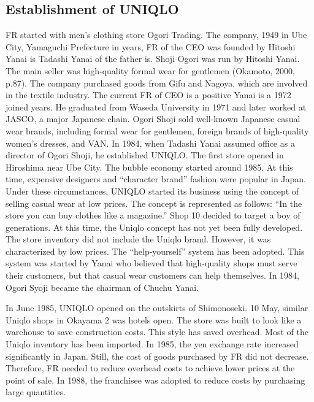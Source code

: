 \documentclass[12pt,a4paper]{article}
\begin{document}
\hypertarget{establishment-of-uniqlo}{%
\subsection{Establishment of UNIQLO}\label{establishment-of-uniqlo}}

FR started with men's clothing store Ogori Trading. The company, 1949 in
Ube City, Yamaguchi Prefecture in years, FR of the CEO was founded by
Hitoshi Yanai is Tadashi Yanai of the father is. Shoji Ogori was run by
Hitoshi Yanai. The main seller was high-quality formal wear for
gentlemen (Okamoto, 2000, p.87). The company purchased goods from Gifu
and Nagoya, which are involved in the textile industry. The current FR
of CEO is a positive Yanai is a 1972 joined years. He graduated from
Waseda University in 1971 and later worked at JASCO, a major Japanese
chain. Ogori Shoji sold well-known Japanese casual wear brands,
including formal wear for gentlemen, foreign brands of high-quality
women's dresses, and VAN. In 1984, when Tadashi Yanai assumed office as
a director of Ogori Shoji, he established UNIQLO. The first store opened
in Hiroshima near Ube City. The bubble economy started around 1985. At
this time, expensive designers and ``character brand'' fashion were
popular in Japan. Under these circumstances, UNIQLO started its business
using the concept of selling casual wear at low prices. The concept is
represented as follows: ``In the store you can buy clothes like a
magazine.'' Shop 10 decided to target a boy of generations. At this
time, the Uniqlo concept has not yet been fully developed. The store
inventory did not include the Uniqlo brand. However, it was
characterized by low prices. The ``help-yourself'' system has been
adopted. This system was started by Yanai who believed that high-quality
shops must serve their customers, but that casual wear customers can
help themselves. In 1984, Ogori Syoji became the chairman of Chuchu
Yanai.

In June 1985, UNIQLO opened on the outskirts of Shimonoseki. 10 May,
similar Uniqlo shops in Okayama 2 was hotels open. The store was built
to look like a warehouse to save construction costs. This style has
saved overhead. Most of the Uniqlo inventory has been imported. In 1985,
the yen exchange rate increased significantly in Japan. Still, the cost
of goods purchased by FR did not decrease. Therefore, FR needed to
reduce overhead costs to achieve lower prices at the point of sale. In
1988, the franchisee was adopted to reduce costs by purchasing large
quantities.
\end{document}
